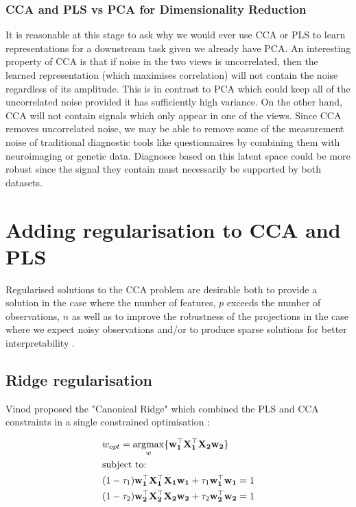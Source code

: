 \subsubsection{CCA and PLS vs PCA for Dimensionality Reduction}

It is reasonable at this stage to ask why we would ever use CCA or PLS to learn representations for a downstream task given we already have PCA. An interesting property of CCA is that if noise in the two views is uncorrelated, then the learned representation (which maximises correlation) will not contain the noise regardless of its amplitude. This is in contrast to PCA which could keep all of the uncorrelated noise provided it has sufficiently high variance. On the other hand, CCA will not contain signals which only appear in one of the views. Since CCA removes uncorrelated noise, we may be able to remove some of the measurement noise of traditional diagnostic tools like questionnaires by combining them with neuroimaging or genetic data. Diagnoses based on this latent space could be more robust since the signal they contain must necessarily be supported by both datasets.

\section{Adding regularisation to CCA and PLS}

Regularised solutions to the CCA problem are desirable both to provide a solution in the case where the number of features, $p$ exceeds the number of observations, $n$ as well as to improve the robustness of the projections in the case where we expect noisy observations \cite{branco2005robust} and/or to produce sparse solutions for better interpretability \cite{parkhomenko2009sparse}.

\subsection{Ridge regularisation}\label{sec:Regularised CCA}

Vinod proposed the "Canonical Ridge" which combined the PLS and CCA constraints in a single constrained optimisation \cite{vinod1976canonical}:

\begin{align}
     & w_{opt}=\underset{w}{\mathrm{argmax}}\{\mathbf{w_1^{\top}X_1^{\top}X_2w_2}\}        \\
     & \text{subject to:} \notag                                                           \\
     & (1-\tau_1)\mathbf{w_1^{\top}X_1^{\top}X_1w_1}+\tau_1\mathbf{w_1^{\top}w_1}=1 \notag \\
     & (1-\tau_2)\mathbf{w_2^{\top}X_2^{\top}X_2w_2}+\tau_2\mathbf{w_2^{\top}w_2}=1 \notag
\end{align}


